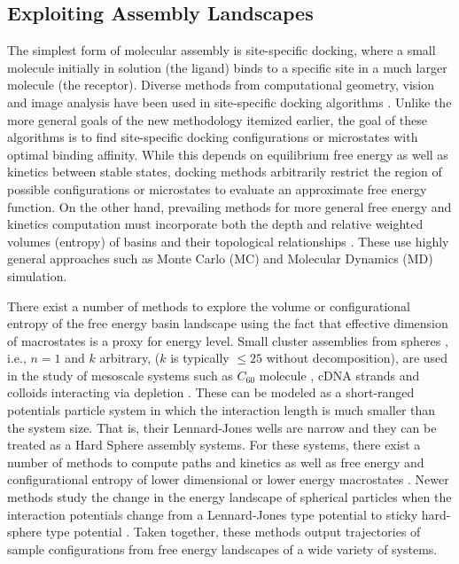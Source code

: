 \documentclass[]{article}
\begin{document}
\subsection{Exploiting Assembly Landscapes}
\label{sec:intro:ExploitingAssembly}
The simplest form of molecular assembly is site-specific docking, where a small
molecule initially in solution (the ligand) binds to a specific site in a much
larger molecule (the receptor). Diverse methods from computational geometry,
vision and image analysis have been used in site-specific docking algorithms
\cite{Bespamyatnikh, Choi2004, pmid1549581, Duhovny2002, pmid15980490,
Bolia2014, Bolia2016, Zhou2018}. Unlike the more general goals of the new
methodology itemized earlier, the goal of these algorithms is to find
site-specific docking configurations or microstates with optimal binding
affinity. While this depends on equilibrium free energy as well as kinetics
between stable states, docking methods arbitrarily restrict the region of
possible configurations or microstates to evaluate an approximate free energy
function. On the other hand, prevailing methods for more general free energy
and kinetics computation must incorporate both the depth and relative weighted
volumes (entropy) of basins and their topological relationships . These use
highly general approaches such as Monte Carlo (MC) and Molecular Dynamics (MD)
simulation.\cite{kaku, Head_Given_Gilson_1997, kurnikov1999harlem,
Andricioaei_Karplus_2001, Hnizdo_Darian_Fedorowicz_Demchuk_Li_Singh_2007,
Killian_Yundenfreund_Kravitz_Gilson_2007, Hnizdo_Tan_Killian_Gilson_2008,
Clark2009, Clark2009-Fragment, brooks2009charmm, Hensen_Lange_Grubmuller_2010,
GregoryS201199, King2012, Koppisetty2013, case2010amber, Jiang2019}

There exist a number of methods to explore the volume or configurational
entropy of the free energy basin landscape using the fact that effective
dimension of macrostates is a proxy for energy level. Small cluster assemblies
from spheres \cite{Arkus2009, Wales2010, Beltran-Villegas2011, Calvo2012,
Khan2012, Hoy2012, Hoy2014}, i.e., $n=1$ and $k$ arbitrary, ($k$ is typically
$\le 25$ without decomposition), are used in the study of mesoscale systems
such as $C_{60}$ molecule \cite{Doye1996, Hagen1993}, cDNA strands
\cite{Meng2010} and colloids interacting via depletion \cite{Gazzillo2006}.
These can be modeled as a short-ranged potentials particle system in which the
interaction length is much smaller than the system size. That is, their
Lennard-Jones wells are narrow and they can be treated as a Hard Sphere
assembly systems. For these systems, there exist a number of methods to
compute paths and kinetics as well as free energy and configurational entropy
of lower dimensional or lower energy macrostates \cite{Holmes-Cerfon2013,
Arkus2009, Wales2010, Beltran-Villegas2011, Calvo2012, Khan2012, Hoy2012,
Hoy2014}. Newer methods study the change in the energy landscape of spherical
particles when the interaction potentials change from a Lennard-Jones type
potential to sticky hard-sphere type potential \cite{Wales-Sticky2018,
trubiano2019canyons}. Taken together, these methods output trajectories of
sample configurations from free energy landscapes of a wide variety of systems.
\end{document}
